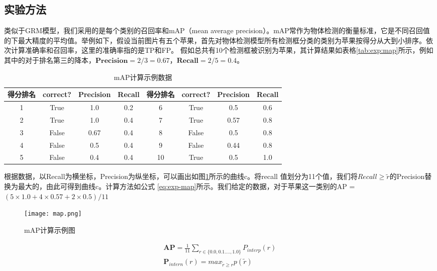 \subsection{实验方法}
类似于GRM模型，我们采用的是每个类别的召回率和mAP（mean average precision）。mAP常作为物体检测的衡量标准，它是不同召回值的下最大精度的平均值。举例如下，假设当前图片有五个苹果，首先对物体检测模型所有检测框分类的类别为苹果按得分从大到小排序。依次计算准确率和召回率，这里的准确率指的是TP和FP。 假如总共有10个检测框被识别为苹果，其计算结果如表格\ref{tab:exp:map}所示，例如其中的对于排名第三的降本，$\textbf{Precision} = 2/3 = 0.67$，$\textbf{Recall} = 2/5 = 0.4$。
\begin{table}[htpb]
  \centering
  \caption{mAP计算示例数据}
  \label{tab:exp-map}
  \begin{tabular}{c|c|c|c|c|c|c|c}
    \toprule
    \textbf{得分排名} & \textbf{correct?} & \textbf{Precision} & \textbf{Recall}  & \textbf{得分排名} & \textbf{correct?} & \textbf{Precision} & \textbf{Recall}   \\
    \midrule
    1 & True & 1.0 & 0.2  & 6 & True & 0.5 & 0.6    \\
    \midrule
    2 &  True & 1.0 & 0.4  & 7 & True & 0.57 & 0.8  \\
    \midrule
    3 & False & 0.67 & 0.4  & 8 & False & 0.5 & 0.8  \\
    \midrule
    4 & False & 0.5 & 0.4   & 9 & False & 0.44 & 0.8 \\
    \midrule
    5 & False & 0.4 & 0.4  & 10 & True & 0.5 & 1.0 \\
    \bottomrule
  \end{tabular}
\end{table}
根据数据，以Recall为横坐标，Precision为纵坐标，可以画出如图\ref{fig:exp-map}所示的曲线c。将recall 值划分为11个值，我们将$Recall \geq \widetilde{r}$的Precision替换为最大的，由此可得到曲线c。计算方法如公式
\ref{eq:exp-map}所示。我们给定的数据，对于苹果这一类别的AP = $(5 \times 1.0 + 4 \times 0.57 + 2 \times 0.5)/11$
\begin{figure}[htpb]
	\centering
	\texttt{[image: map.png]}
    \caption{mAP计算示例图}
	\vspace*{-3.5mm}
	\label{fig:exp-map}
\end{figure}
\begin{equation} \label{eq:exp-map}
\begin{split}
    \mathbf{AP} = \frac{1}{11}\sum_{r \in \{0.0,0.1....,1.0\}}P_{interp}(r) \\
    \mathbf{P}_{intern}(r) = max_{\widetilde{r} \geq r}p(\widetilde{r})
\end{split}
\end{equation}

